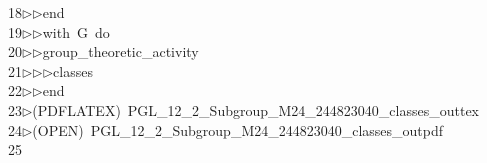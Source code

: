 \begin{tabbing}
18\>$\triangleright$\>$\triangleright$\>end\ \\[0pt]
19\>$\triangleright$\>$\triangleright$\>with\ G\ do\ \\[0pt]
20\>$\triangleright$\>$\triangleright$\>group\_theoretic\_activity\ \\[0pt]
21\>$\triangleright$\>$\triangleright$\>$\triangleright$\>classes\ \\[0pt]
22\>$\triangleright$\>$\triangleright$\>end\\[0pt]
23\>$\triangleright$\>(PDFLATEX)\ PGL\_12\_2\_Subgroup\_M24\_244823040\_classes\_outtex\\[0pt]
24\>$\triangleright$\>(OPEN)\ PGL\_12\_2\_Subgroup\_M24\_244823040\_classes\_outpdf\\[0pt]
25\>\end{tabbing}
